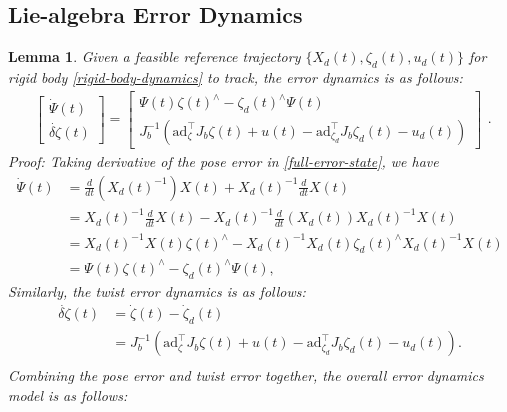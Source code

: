 \documentclass[lettersize,journal]{IEEEtran}
\newtheorem{mylem}{Lemma}
\newcommand{\ad}{\text{ad}}
\begin{document}
\subsection{Lie-algebra Error Dynamics}
\begin{mylem}
Given a feasible reference trajectory $\{X_d(t), \zeta_d(t), u_d(t)\}$ for rigid body \eqref{rigid-body-dynamics} to track, the error dynamics is as follows:
\begin{equation} \label{SE3-ERROR-Dynamics}
    \begin{aligned}
        \begin{bmatrix}
            \dot{\Psi}(t)\\ \dot{\delta \zeta}(t)
        \end{bmatrix} = \begin{bmatrix}
            \Psi(t) \zeta(t)^{\wedge}-\zeta_{d}(t)^{\wedge} \Psi(t)\\
            J_b^{-1} (\ad_{\zeta}^{\top}J_b\zeta(t) + u(t) -\ad_{\zeta_d}^{\top}J_b\zeta_d(t) - u_d(t))
        \end{bmatrix}
    \end{aligned}.
\end{equation}
\noindent \textit{Proof:} Taking derivative of the pose error in \eqref{full-error-state}, we have
\begin{equation}\label{pose-error-dynamics}
    \begin{aligned}
\dot{\Psi}(t)&=\frac{d}{d t}\left(X_{d}(t)^{-1}\right) X(t)+X_{d}(t)^{-1} \frac{d}{d t} X(t) \\
& =X_{d}(t)^{-1} \frac{d}{d t} X(t)-X_{d}(t)^{-1} \frac{d}{d t}\left(X_{d}(t)\right) X_{d}(t)^{-1} X(t) \\
& =X_{d}(t)^{-1} X(t) \zeta(t)^{\wedge}-X_{d}(t)^{-1} X_{d}(t) \zeta_{d}(t)^{\wedge} X_{d}(t)^{-1} X(t) \\
& =\Psi(t) \zeta(t)^{\wedge}-\zeta_{d}(t)^{\wedge} \Psi(t),
\end{aligned}
\end{equation}
Similarly, the twist error dynamics is as follows:
\begin{equation*}
\begin{aligned}
    \dot{\delta \zeta}(t) &= \dot{\zeta}(t) - \dot{\zeta}_d(t)\\
    &= J_b^{-1} (\ad_{\zeta}^{\top}J_b\zeta(t) + u(t) -\ad_{\zeta_d}^{\top}J_b\zeta_d(t) - u_d(t)).\\
\end{aligned}
\end{equation*}
Combining the pose error and twist error together, the overall error dynamics model is as follows:

\end{mylem}
\end{document}
